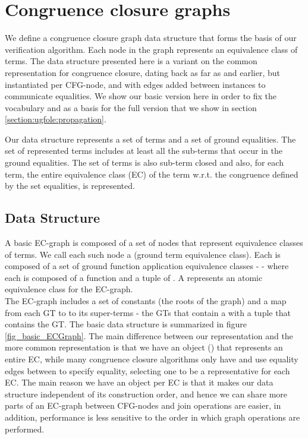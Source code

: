 
\section{Congruence closure graphs}
We define a congruence closure graph data structure that forms the basis of our verification algorithm. Each node in the graph represents an equivalence class of terms.
The data structure presented here is a variant on the common representation for congruence closure, dating back as far as \cite{DowneySethiTarjan} and earlier, but instantiated per CFG-node, and with edges added between instances to communicate equalities. We show our basic version here in order to fix the vocabulary and as a basis for the full version that we show in section \ref{section:ugfole:propagation}.

Our data structure represents a set of terms and a set of ground equalities.
The set of represented terms includes at least all the sub-terms that occur in the ground equalities.
The set of terms is also sub-term closed and also, for each term, the entire equivalence class (EC) of the term w.r.t. the congruence defined by the set equalities, is represented.

\subsection{Data Structure}
A basic EC-graph is composed of a set of nodes that represent equivalence classes of terms. We call each such node a \newdef{\GT{}} (ground term equivalence class). Each \GT{} is composed of a set of ground function application equivalence classes - \newdef{\GFAs} - where each \GFA{} is composed of a function and a tuple of \GTs{}. A \GFA{} represents an atomic equivalence class for the EC-graph.\\
The EC-graph includes a set of constants (the roots of the graph) and a map from each GT to to its super-terms - the GTs that contain a \GFA{} with a tuple that contains the GT. The basic data structure is summarized in figure \ref{fig_basic_ECGraph}.
The main difference between our representation and the more common representation is that we have an object (\GT{}) that represents an entire EC, while many congruence closure algorithms only have \GFAs{} and use equality edges between \GFAs{} to specify equality, selecting one \GFA{} to be a representative for each EC. 
The main reason we have an object per EC is that it makes our data structure independent of its construction order, 
and hence we can share more parts of an EC-graph between CFG-nodes and join operations are easier, in addition, performance is less sensitive to the order in which graph operations are performed.

